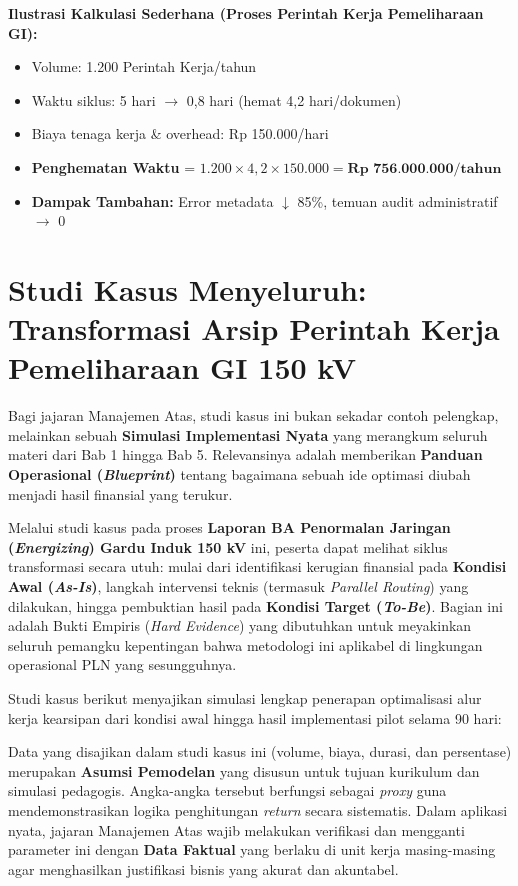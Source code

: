 \documentclass[12pt,a4paper]{report}
\begin{document}
\begin{plnbox}
\textbf{Ilustrasi Kalkulasi Sederhana (Proses Perintah Kerja Pemeliharaan GI):}
\begin{itemize}[nosep]
    \item Volume: 1.200 Perintah Kerja/tahun
    \item Waktu siklus: 5 hari $\rightarrow$ 0,8 hari (hemat 4,2 hari/dokumen)
    \item Biaya tenaga kerja \& overhead: Rp 150.000/hari
    \item \textbf{Penghematan Waktu} = $1.200 \times 4,2 \times 150.000 = \textbf{Rp 756.000.000/tahun}$
    \item \textbf{Dampak Tambahan:} Error metadata $\downarrow$ 85\%, temuan audit administratif $\rightarrow$ 0
\end{itemize}
\end{plnbox}

\section{Studi Kasus Menyeluruh: Transformasi Arsip Perintah Kerja Pemeliharaan GI 150 kV}
\label{sec:studikasus}

Bagi jajaran Manajemen Atas, studi kasus ini bukan sekadar contoh pelengkap, melainkan sebuah \textbf{Simulasi Implementasi Nyata} yang merangkum seluruh materi dari Bab 1 hingga Bab 5. Relevansinya adalah memberikan \textbf{Panduan Operasional (\textit{Blueprint})} tentang bagaimana sebuah ide optimasi diubah menjadi hasil finansial yang terukur. 

Melalui studi kasus pada proses \textbf{Laporan BA Penormalan Jaringan (\textit{Energizing}) Gardu Induk 150 kV} ini, peserta dapat melihat siklus transformasi secara utuh: mulai dari identifikasi kerugian finansial pada \textbf{Kondisi Awal (\textit{As-Is})}, langkah intervensi teknis (termasuk \textit{Parallel Routing}) yang dilakukan, hingga pembuktian hasil pada \textbf{Kondisi Target (\textit{To-Be})}. Bagian ini adalah Bukti Empiris (\textit{Hard Evidence}) yang dibutuhkan untuk meyakinkan seluruh pemangku kepentingan bahwa metodologi ini aplikabel di lingkungan operasional PLN yang sesungguhnya.

Studi kasus berikut menyajikan simulasi lengkap penerapan optimalisasi alur kerja kearsipan dari kondisi awal hingga hasil implementasi pilot selama 90 hari:

\begin{warnbox}
Data yang disajikan dalam studi kasus ini (volume, biaya, durasi, dan persentase) merupakan \textbf{Asumsi Pemodelan} yang disusun untuk tujuan kurikulum dan simulasi pedagogis. Angka-angka tersebut berfungsi sebagai \textit{proxy} guna mendemonstrasikan logika penghitungan \textit{return} secara sistematis. Dalam aplikasi nyata, jajaran Manajemen Atas wajib melakukan verifikasi dan mengganti parameter ini dengan \textbf{Data Faktual} yang berlaku di unit kerja masing-masing agar menghasilkan justifikasi bisnis yang akurat dan akuntabel.
\end{warnbox}
\end{document}
